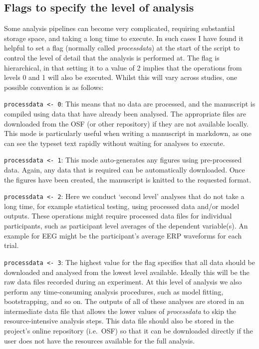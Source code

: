 \documentclass[
]{article}
\begin{document}
\hypertarget{flags-to-specify-the-level-of-analysis}{%
\subsection{Flags to specify the level of analysis}\label{flags-to-specify-the-level-of-analysis}}

Some analysis pipelines can become very complicated, requiring substantial storage space, and taking a long time to execute. In such cases I have found it helpful to set a flag (normally called \emph{processdata}) at the start of the script to control the level of detail that the analysis is performed at. The flag is hierarchical, in that setting it to a value of 2 implies that the operations from levels 0 and 1 will also be executed. Whilst this will vary across studies, one possible convention is as follows:

\texttt{processdata\ \textless{}-\ 0}: This means that no data are processed, and the manuscript is compiled using data that have already been analysed. The appropriate files are downloaded from the OSF (or other repository) if they are not available locally. This mode is particularly useful when writing a manuscript in markdown, as one can see the typeset text rapidly without waiting for analyses to execute.

\texttt{processdata\ \textless{}-\ 1}: This mode auto-generates any figures using pre-processed data. Again, any data that is required can be automatically downloaded. Once the figures have been created, the manuscript is knitted to the requested format.

\texttt{processdata\ \textless{}-\ 2}: Here we conduct `second level' analyses that do not take a long time, for example statistical testing, using processed data and/or model outputs. These operations might require processed data files for individual participants, such as participant level averages of the dependent variable(s). An example for EEG might be the participant's average ERP waveforms for each trial.

\texttt{processdata\ \textless{}-\ 3}: The highest value for the flag specifies that all data should be downloaded and analysed from the lowest level available. Ideally this will be the raw data files recorded during an experiment. At this level of analysis we also perform any time-consuming analysis procedures, such as model fitting, bootstrapping, and so on. The outputs of all of these analyses are stored in an intermediate data file that allows the lower values of \emph{processdata} to skip the resource-intensive analysis steps. This data file should also be stored in the project's online repository (i.e.~OSF) so that it can be downloaded directly if the user does not have the resources available for the full analysis.
\end{document}
